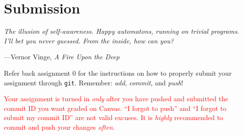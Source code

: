 \section{Submission}
\epigraph{\emph{The illusion of self-awareness. Happy automatons, running on trivial programs. I'll bet you never guessed. From the inside, how can you?}}{---Vernor Vinge, \emph{A Fire Upon the Deep}}

\noindent
Refer back assignment 0 for the instructions on how to properly submit
your assignment through \texttt{git}. Remember: \emph{add},
\emph{commit}, and \emph{push}!

\textcolor{red}{Your assignment is turned in \emph{only} after you have
pushed and submitted the commit ID you want graded on Canvas. ``I
forgot to push'' and ``I forgot to submit my commit ID'' are not valid
excuses. It is \emph{highly} recommended to commit and push your changes
\emph{often}.}
